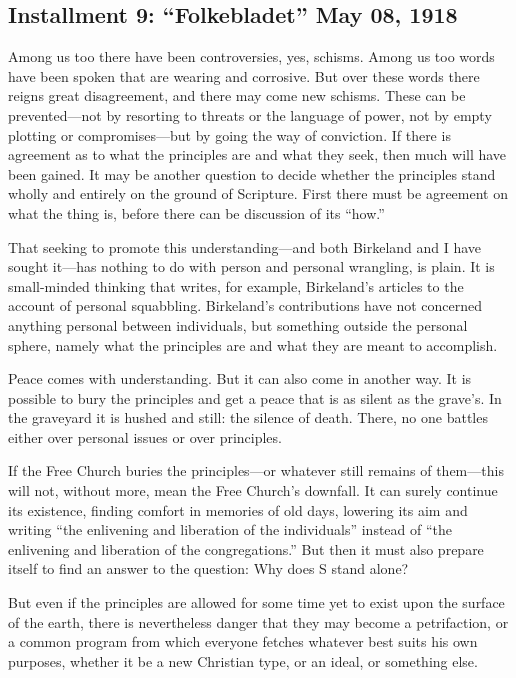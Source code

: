 

\subsection{Installment 9: “Folkebladet” May 08, 1918}

Among us too there have been controversies, yes, schisms. Among us too words have been spoken that are wearing and corrosive. But over these words there reigns great disagreement, and there may come new schisms. These can be prevented—not by resorting to threats or the language of power, not by empty plotting or compromises—but by going the way of conviction. If there is agreement as to what the principles are and what they seek, then much will have been gained. It may be another question to decide whether the principles stand wholly and entirely on the ground of Scripture. First there must be agreement on what the thing is, before there can be discussion of its “how.”

That seeking to promote this understanding—and both Birkeland and I have sought it—has nothing to do with person and personal wrangling, is plain. It is small-minded thinking that writes, for example, Birkeland’s articles to the account of personal squabbling. Birkeland’s contributions have not concerned anything personal between individuals, but something outside the personal sphere, namely what the principles are and what they are meant to accomplish.

Peace comes with understanding. But it can also come in another way. It is possible to bury the principles and get a peace that is as silent as the grave’s. In the graveyard it is hushed and still: the silence of death. There, no one battles either over personal issues or over principles.

If the Free Church buries the principles—or whatever still remains of them—this will not, without more, mean the Free Church’s downfall. It can surely continue its existence, finding comfort in memories of old days, lowering its aim and writing “the enlivening and liberation of the individuals” instead of “the enlivening and liberation of the congregations.” But then it must also prepare itself to find an answer to the question: Why does S stand alone?

But even if the principles are allowed for some time yet to exist upon the surface of the earth, there is nevertheless danger that they may become a petrifaction, or a common program from which everyone fetches whatever best suits his own purposes, whether it be a new Christian type, or an ideal, or something else.

